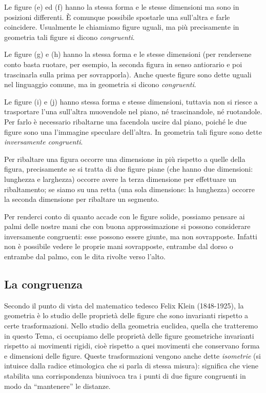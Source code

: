 Le figure (e) ed (f) hanno la stessa forma e le stesse dimensioni ma sono in posizioni differenti. \`E comunque possibile spostarle una sull'altra e farle coincidere. Usualmente le chiamiamo figure uguali, ma più precisamente in geometria tali figure si dicono \emph{congruenti}.

Le figure (g) e (h) hanno la stessa forma e le stesse dimensioni (per rendersene conto basta ruotare, per esempio, la seconda figura in senso antiorario e poi trascinarla sulla prima per sovrapporla). Anche queste figure sono dette uguali nel linguaggio comune, ma in geometria si dicono \emph{congruenti}.

Le figure (i) e (j) hanno stessa forma e stesse dimensioni, tuttavia non si riesce a trasportare l'una sull'altra muovendole nel piano, né trascinandole, né ruotandole. Per farlo è necessario ribaltarne una facendola uscire dal piano, poiché le due figure sono una l'immagine speculare dell'altra. In geometria tali figure sono dette \emph{inversamente congruenti}.

\begin{figure}[htb]
\centering\label{fig:figure_i_j}
\end{figure}

\osservazione Per ribaltare una figura occorre una dimensione in più rispetto a quelle della figura, precisamente se si tratta di due figure piane (che hanno due dimensioni: lunghezza e larghezza)  occorre avere la terza dimensione per effettuare un ribaltamento; se siamo su una retta (una sola dimensione: la lunghezza) occorre la seconda dimensione per ribaltare un segmento.

Per renderci conto di quanto accade con le figure solide, possiamo pensare ai palmi delle nostre mani che con buona approssimazione si possono considerare inversamente congruenti: esse possono essere giunte, ma non sovrapposte. Infatti non è possibile vedere le proprie mani sovrapposte, entrambe dal dorso o entrambe dal palmo, con le dita rivolte verso l'alto.

\subsection{La congruenza}

Secondo il punto di vista del matematico tedesco Felix Klein (1848-1925), la geometria è lo studio delle proprietà delle figure che sono invarianti rispetto a certe trasformazioni. Nello studio della geometria euclidea, quella che tratteremo in questo Tema, ci occupiamo delle proprietà delle figure geometriche invarianti rispetto ai movimenti rigidi, cioè rispetto a quei movimenti che conservano forma e dimensioni delle figure. Queste trasformazioni vengono anche dette \emph{isometrie} (si intuisce dalla radice etimologica che si parla di stessa misura): significa che viene stabilita una corrispondenza biunivoca tra i punti di due figure congruenti in modo da ``mantenere'' le distanze.

